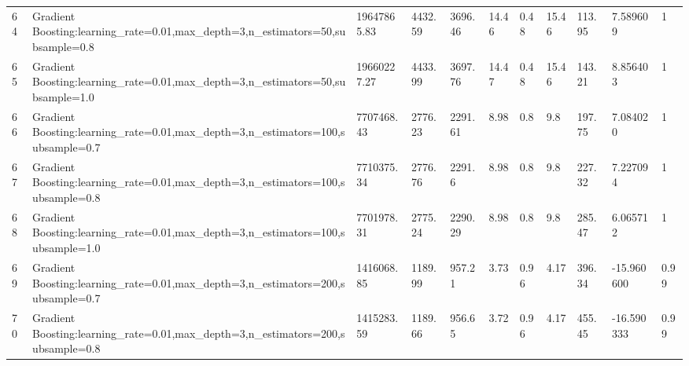 \begin{longtable}{C{0.8cm} L{2cm} C{1.15cm} C{1.15cm} C{1.15cm} C{1.15cm} C{0.85cm} C{1.25cm} C{1.2cm} C{1.5cm} C{1.0cm}}
64 & Gradient Boosting:\newline learning\_rate=0.01,\newline max\_depth=3,\newline n\_estimators=50,\newline subsample=0.8 & 19647865.83 & 4432.59 & 3696.46 & 14.46 & 0.48 & 15.46 & 113.95 & 7.589609 & 1 \\
65 & Gradient Boosting:\newline learning\_rate=0.01,\newline max\_depth=3,\newline n\_estimators=50,\newline subsample=1.0 & 19660227.27 & 4433.99 & 3697.76 & 14.47 & 0.48 & 15.46 & 143.21 & 8.856403 & 1 \\
66 & Gradient Boosting:\newline learning\_rate=0.01,\newline max\_depth=3,\newline n\_estimators=100,\newline subsample=0.7 & 7707468.43 & 2776.23 & 2291.61 & 8.98 & 0.8 & 9.8 & 197.75 & 7.084020 & 1 \\
67 & Gradient Boosting:\newline learning\_rate=0.01,\newline max\_depth=3,\newline n\_estimators=100,\newline subsample=0.8 & 7710375.34 & 2776.76 & 2291.6 & 8.98 & 0.8 & 9.8 & 227.32 & 7.227094 & 1 \\
68 & Gradient Boosting:\newline learning\_rate=0.01,\newline max\_depth=3,\newline n\_estimators=100,\newline subsample=1.0 & 7701978.31 & 2775.24 & 2290.29 & 8.98 & 0.8 & 9.8 & 285.47 & 6.065712 & 1 \\
69 & Gradient Boosting:\newline learning\_rate=0.01,\newline max\_depth=3,\newline n\_estimators=200,\newline subsample=0.7 & 1416068.85 & 1189.99 & 957.21 & 3.73 & 0.96 & 4.17 & 396.34 & -15.960600 & 0.99 \\
70 & Gradient Boosting:\newline learning\_rate=0.01,\newline max\_depth=3,\newline n\_estimators=200,\newline subsample=0.8 & 1415283.59 & 1189.66 & 956.65 & 3.72 & 0.96 & 4.17 & 455.45 & -16.590333 & 0.99 \\

\end{longtable}
